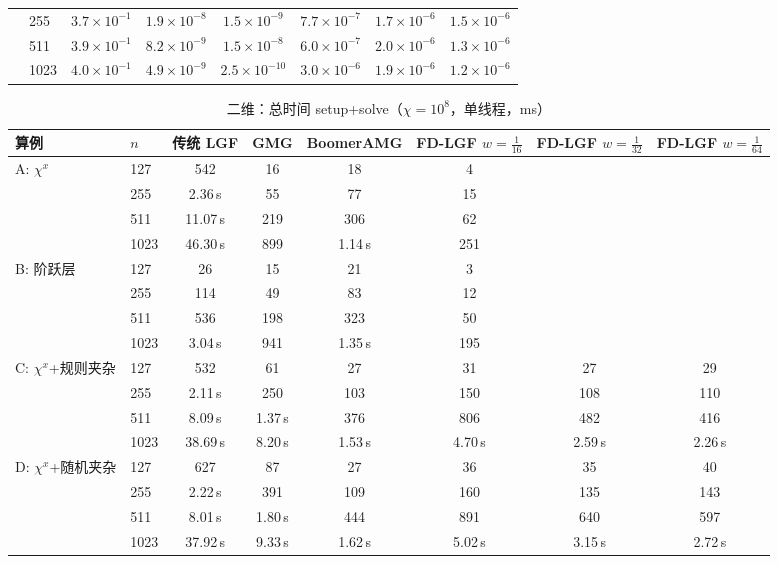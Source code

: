 \begin{table}[H]
\begin{adjustbox}{max width=\textwidth}
\begin{tabular}{llcccccc}
 & 255 & $3.7{\times}10^{-1}$ & $1.9{\times}10^{-8}$ & $1.5{\times}10^{-9}$ & $7.7{\times}10^{-7}$ & $1.7{\times}10^{-6}$ & $1.5{\times}10^{-6}$ \\
 & 511 & $3.9{\times}10^{-1}$ & $8.2{\times}10^{-9}$ & $1.5{\times}10^{-8}$ & $6.0{\times}10^{-7}$ & $2.0{\times}10^{-6}$ & $1.3{\times}10^{-6}$ \\
 & 1023 & $4.0{\times}10^{-1}$ & $4.9{\times}10^{-9}$ & $2.5{\times}10^{-10}$ & $3.0{\times}10^{-6}$ & $1.9{\times}10^{-6}$ & $1.2{\times}10^{-6}$ \\
\bottomrule
\end{tabular}
\end{adjustbox}
\end{table}

\begin{table}[H]\centering\small
\caption{二维：总时间 setup+solve（$\chi=10^8$，单线程，ms）}\label{tab:time2d}
\begin{adjustbox}{max width=\textwidth}
\begin{tabular}{llcccccc}
\toprule
算例 & $n$ & 传统 LGF & GMG & BoomerAMG & FD-LGF $w{=}\frac1{16}$ & FD-LGF $w{=}\frac1{32}$ & FD-LGF $w{=}\frac1{64}$ \\
\midrule
A: $\chi^x$ & 127 & 542 & 16 & 18 & 4 &  &  \\
 & 255 & 2.36\,s & 55 & 77 & 15 &  &  \\
 & 511 & 11.07\,s & 219 & 306 & 62 &  &  \\
 & 1023 & 46.30\,s & 899 & 1.14\,s & 251 &  &  \\
\midrule
B: 阶跃层 & 127 & 26 & 15 & 21 & 3 &  &  \\
 & 255 & 114 & 49 & 83 & 12 &  &  \\
 & 511 & 536 & 198 & 323 & 50 &  &  \\
 & 1023 & 3.04\,s & 941 & 1.35\,s & 195 &  &  \\
\midrule
C: $\chi^x$+规则夹杂 & 127 & 532 & 61 & 27 & 31 & 27 & 29 \\
 & 255 & 2.11\,s & 250 & 103 & 150 & 108 & 110 \\
 & 511 & 8.09\,s & 1.37\,s & 376 & 806 & 482 & 416 \\
 & 1023 & 38.69\,s & 8.20\,s & 1.53\,s & 4.70\,s & 2.59\,s & 2.26\,s \\
\midrule
D: $\chi^x$+随机夹杂 & 127 & 627 & 87 & 27 & 36 & 35 & 40 \\
 & 255 & 2.22\,s & 391 & 109 & 160 & 135 & 143 \\
 & 511 & 8.01\,s & 1.80\,s & 444 & 891 & 640 & 597 \\
 & 1023 & 37.92\,s & 9.33\,s & 1.62\,s & 5.02\,s & 3.15\,s & 2.72\,s \\
\bottomrule
\end{tabular}
\end{adjustbox}
\end{table}

